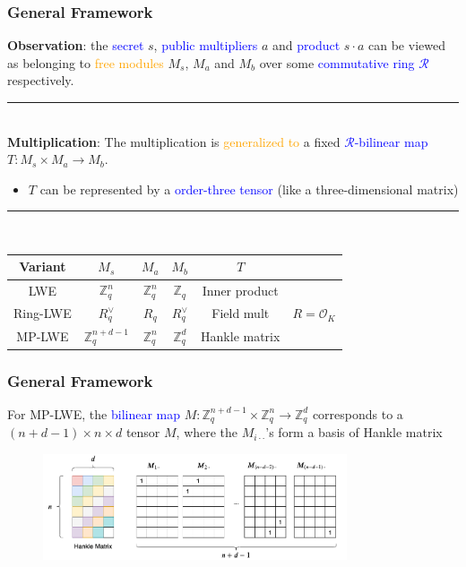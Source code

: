 \documentclass{beamer}
\newcommand{\blue}[1]{\textcolor{blue}{#1}}
\newcommand{\dgreen}[1]{\textcolor{dgreen}{#1}}
\newcommand{\orange}[1]{\textcolor{orange}{#1}}
\newcommand{\cO}{\mathcal{O}}
\newcommand{\cR}{\mathcal{R}}
\newcommand{\bbZ}{\mathbb{Z}}
\newcommand{\divline}{\noindent\rule{6cm}{0.4pt}}
\begin{document}
\frame
{
  \frametitle{General Framework}
  \textbf{Observation}: the \blue{secret} $s$, \blue{public multipliers} $a$ and \blue{product} $s\cdot a$ can be viewed as belonging to \orange{free modules} $M_s$, $M_a$ and $M_b$ over some \blue{commutative ring $\cR$} respectively.

  \divline\\

  \textbf{Multiplication}: The multiplication is \orange{generalized to} a fixed \blue{$\cR$-bilinear map} $T:M_s\times M_a\to M_b$.
  \begin{itemize}
  	\item $T$ can be represented by a \blue{order-three tensor} (like a three-dimensional matrix)
  \end{itemize}

  \divline\\

  \begin{table}[tb]
  	\centering

  	\begin{tabular}{c|ccccc}
  	\hline

  	\hline
  	\textbf{Variant} & $M_s$            & $M_a$      & $M_b$        & $T$           & \\
  	\hline
  		LWE            & $\bbZ_q^n$       & $\bbZ_q^n$ & $\bbZ_q$     & Inner product & \\
  		Ring-LWE       & $R_q^{\vee}$     & $R_q$      & $R_q^{\vee}$ & Field mult    & $R=\cO_K$ \\
  		MP-LWE         & $\bbZ_q^{n+d-1}$ & $\bbZ_q^n$ & $\bbZ_q^d$   & Hankle matrix & \\
  	\hline

  	\hline
  	\end{tabular}
  \end{table}
}

\frame
{
  \frametitle{General Framework}

  For MP-LWE, the \blue{bilinear map} $M:\bbZ_q^{n+d-1}\times\bbZ_q^n\to\bbZ_q^d$ corresponds to a $(n+d-1)\times n\times d$ tensor $M$, where the $M_{i\cdot\cdot}$'s form a \dgreen{basis of Hankle matrix}

  \begin{figure}[ht!]
  \includegraphics[width=0.8\textwidth]{files/Hankle-Matrix}
  \end{figure}

}
\end{document}
